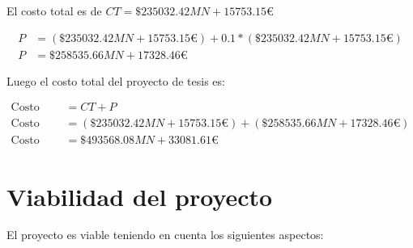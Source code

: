 El costo total es de $CT = \$235032.42MN + 15753.15€$

\begin{align*}
    P & = ( \$235032.42MN + 15753.15€) + 0.1*( \$235032.42MN + 15753.15€) \\
    P & = \$258535.66MN + 17328.46€
\end{align*}

Luego el costo total del proyecto de tesis es:

\begin{align*}
    \text{Costo total del proyecto de tesis} & = CT + P                                                    \\
    \text{Costo total del proyecto de tesis} & = (\$235032.42MN + 15753.15€) + (\$258535.66MN + 17328.46€) \\
    \text{Costo total del proyecto de tesis} & = \$493568.08MN + 33081.61€
\end{align*}


\section{Viabilidad del proyecto}

El proyecto es viable teniendo en cuenta los siguientes aspectos:

